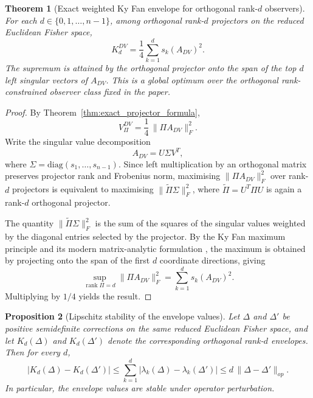 \documentclass[11pt,a4paper]{article}
\numberwithin{equation}{section}
\theoremstyle{thmcompact}
\newtheorem{theorem}{Theorem}[section]
\newtheorem{proposition}[theorem]{Proposition}
\theoremstyle{remark}
\begin{document}
\begin{theorem}[Exact weighted Ky Fan envelope for orthogonal rank-\(d\) observers]
\label{thm:exact_weighted_ky_fan_envelope}
For each \(d\in\{0,1,\dots,n-1\}\), among orthogonal rank-\(d\) projectors on the reduced Euclidean Fisher space,
\begin{equation}
K_d^{DV}
=
\frac14\sum_{k=1}^{d}s_k(A_{DV})^2.
\end{equation}
The supremum is attained by the orthogonal projector onto the span of the top \(d\) left singular vectors of \(A_{DV}\). This is a global optimum over the orthogonal rank-constrained observer class fixed in the paper.
\end{theorem}

\begin{proof}
By Theorem~\ref{thm:exact_projector_formula},
\begin{equation}
V_\Pi^{DV}=\frac14\,\|\Pi A_{DV}\|_F^2.
\end{equation}
Write the singular value decomposition
\begin{equation}
A_{DV}=U\Sigma V^T,
\end{equation}
where \(\Sigma=\mathrm{diag}(s_1,\dots,s_{n-1})\). Since left multiplication by an orthogonal matrix preserves projector rank and Frobenius norm, maximising \(\|\Pi A_{DV}\|_F^2\) over rank-\(d\) projectors is equivalent to maximising \(\|\widetilde\Pi \Sigma\|_F^2\), where \(\widetilde\Pi=U^T\Pi U\) is again a rank-\(d\) orthogonal projector.

The quantity \(\|\widetilde\Pi \Sigma\|_F^2\) is the sum of the squares of the singular values weighted by the diagonal entries selected by the projector. By the Ky Fan maximum principle and its modern matrix-analytic formulation \cite{Fan1951,Bhatia1997}, the maximum is obtained by projecting onto the span of the first \(d\) coordinate directions, giving
\begin{equation}
\sup_{\operatorname{rank}\Pi=d}\|\Pi A_{DV}\|_F^2
=
\sum_{k=1}^{d}s_k(A_{DV})^2.
\end{equation}
Multiplying by \(1/4\) yields the result.
\end{proof}

\begin{proposition}[Lipschitz stability of the envelope values]
\label{prop:lipschitz_envelope_values}
Let \(\Delta\) and \(\Delta'\) be positive semidefinite corrections on the same reduced Euclidean Fisher space, and let \(K_d(\Delta)\) and \(K_d(\Delta')\) denote the corresponding orthogonal rank-\(d\) envelopes. Then for every \(d\),
\begin{equation}
|K_d(\Delta)-K_d(\Delta')|
\le
\sum_{k=1}^d |\lambda_k(\Delta)-\lambda_k(\Delta')|
\le
 d\,\|\Delta-\Delta'\|_{op}.
\end{equation}
In particular, the envelope values are stable under operator perturbation.
\end{proposition}
\end{document}
